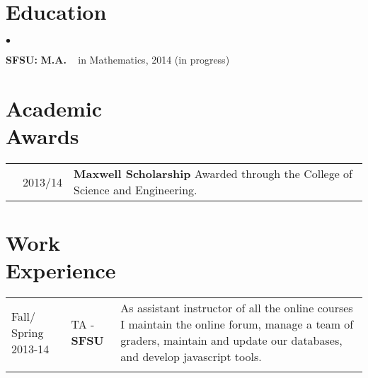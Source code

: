 \documentclass[margin,line,pifont,palatino,courier]{res}
\newenvironment{list2}{
  \begin{list}{$\bullet$}{%
      \setlength{\itemsep}{0in}
      \setlength{\parsep}{0in} \setlength{\parskip}{0in}
      \setlength{\topsep}{0in} \setlength{\partopsep}{0in}
      \setlength{\leftmargin}{0.2in}}}{\end{list}}
\begin{document}
\begin{resume}
\begin{tabular}{@{}p{0.75in}p{4.5in}}
\end{tabular}

 
 \section{\sc Education} 
\begin{list2}
\item  {\bf SFSU:}  \textbf{M.A.} ~ in Mathematics, 2014 (in progress) \\









%

\end{list2}


 \section{\sc Academic \\ Awards}
\begin{tabular}{@{}p{0.10in}p{0.5in}p{4in}}
   &  2013/14 & {\bf Maxwell Scholarship} Awarded through the College of Science and Engineering. \\
\end{tabular}


\section{\sc  Work\\ Experience}

\begin{tabular}{@{}p{0.75in}p{1in}p{3in}}
 Fall/ Spring
 2013-14   & TA -{\bf SFSU } 	
 					 & 
					As assistant instructor of all the online courses I maintain the online forum, manage a team of graders, maintain and update our databases, and develop javascript tools. \\ \\


\end{tabular}
\end{resume}
\end{document}

